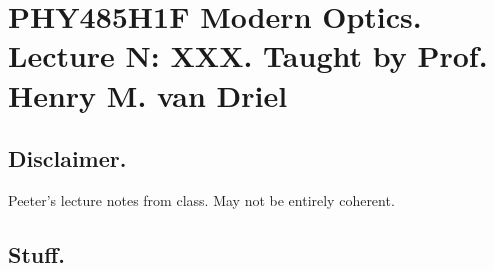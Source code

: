 
%

\chapter{PHY485H1F Modern Optics.  Lecture {N}: XXX.  Taught by Prof. Henry M. van Driel}
\label{chap:modernOpticsL{N}}
{}
\date{Sept XX, 2012}

\beginArtWithToc

\section{Disclaimer.}

Peeter's lecture notes from class.  May not be entirely coherent.

\section{Stuff.}

\EndArticle
